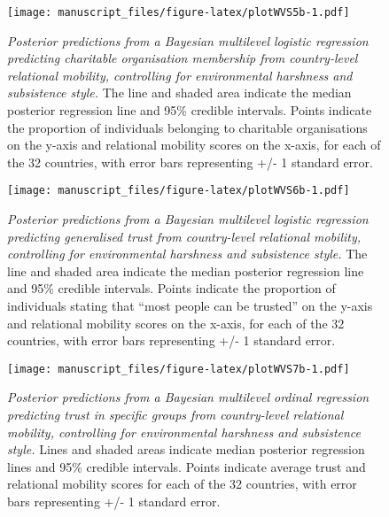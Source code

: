 \documentclass[english,man,floatsintext]{apa6}
\begin{document}
\newpage



\begin{figure}
\centering
\texttt{[image: manuscript\_files/figure-latex/plotWVS5b-1.pdf]}
\caption{\label{fig:plotWVS5b}\emph{Posterior predictions from a Bayesian multilevel logistic regression predicting charitable organisation membership from country-level relational mobility, controlling for environmental harshness and subsistence style.} The line and shaded area indicate the median posterior regression line and 95\% credible intervals. Points indicate the proportion of individuals belonging to charitable organisations on the y-axis and relational mobility scores on the x-axis, for each of the 32 countries, with error bars representing +/- 1 standard error.}
\end{figure}

\newpage



\begin{figure}
\centering
\texttt{[image: manuscript\_files/figure-latex/plotWVS6b-1.pdf]}
\caption{\label{fig:plotWVS6b}\emph{Posterior predictions from a Bayesian multilevel logistic regression predicting generalised trust from country-level relational mobility, controlling for environmental harshness and subsistence style.} The line and shaded area indicate the median posterior regression line and 95\% credible intervals. Points indicate the proportion of individuals stating that \enquote{most people can be trusted} on the y-axis and relational mobility scores on the x-axis, for each of the 32 countries, with error bars representing +/- 1 standard error.}
\end{figure}

\newpage



\begin{figure}
\centering
\texttt{[image: manuscript\_files/figure-latex/plotWVS7b-1.pdf]}
\caption{\label{fig:plotWVS7b}\emph{Posterior predictions from a Bayesian multilevel ordinal regression predicting trust in specific groups from country-level relational mobility, controlling for environmental harshness and subsistence style.} Lines and shaded areas indicate median posterior regression lines and 95\% credible intervals. Points indicate average trust and relational mobility scores for each of the 32 countries, with error bars representing +/- 1 standard error.}
\end{figure}

\newpage
\end{document}
